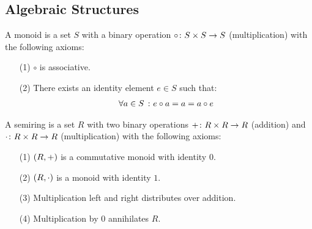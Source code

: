 \subsection{Algebraic Structures}

\begin{definition}[Monoid]
  A monoid is a set \(S\) with a binary operation
  \(\circ \colon S \times S \to S\) (multiplication) with the following axioms:
  \begin{enumerate}
    \item[(1)]
      \(\circ\) is associative.

    \item[(2)]
      There exists an identity element \(e \in S\) such that:
      \begin{align*}
        \forall a \in S \ \colon e \circ a = a = a \circ e
      \end{align*}
  \end{enumerate}
\end{definition}


\begin{definition}[Semiring]
  A semiring is a set \(R\) with two binary operations
  \(+ \colon R \times R \to R\) (addition) and
  \(\cdot \colon R \times R \to R\) (multiplication) with the following axioms:
  \begin{enumerate}
    \item[(1)]
      \(\left(R, +\right)\) is a commutative monoid with identity \(0\).

    \item[(2)]
      \(\left(R, \cdot\right)\) is a monoid with identity \(1\).

    \item[(3)]
      Multiplication left and right distributes over addition.

    \item[(4)]
      Multiplication by \(0\) annihilates \(R\).
  \end{enumerate}
\end{definition}


